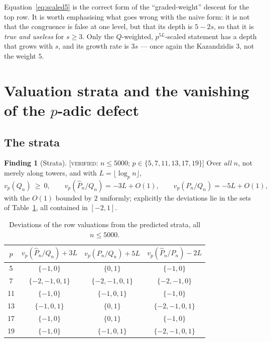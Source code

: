 \documentclass[11pt,reqno]{article}
\newcommand{\Ph}{\widehat{P}}
\newcommand{\vp}{v_p}
\newcommand{\floor}[1]{\lfloor #1 \rfloor}
\newcommand{\VER}[1]{{\normalfont\textsc{[verified:} #1\textsc{]}}}
\theoremstyle{plain}
\theoremstyle{definition}
\newtheorem{finding}[theorem]{Finding}
\theoremstyle{remark}
\numberwithin{equation}{section}
\begin{document}
Equation~\eqref{eq:scaled5} is the correct form of the ``graded-weight''
descent for the top row.  It is worth emphasising what goes wrong with the
naive form: it is not that the congruence is false at one level, but that its
depth is $5-2s$, so that it is \emph{true and useless} for $s\ge3$.  Only the
$Q$-weighted, $p^{5L}$-scaled statement has a depth that grows with $s$, and
its growth rate is $3s$ --- once again the Kazandzidis $3$, not the weight $5$.

\section{Valuation strata and the vanishing of the $p$-adic defect}\label{sec:strata}

\subsection{The strata}\label{ss:strata}

\begin{finding}[Strata]\label{find:strata}
\VER{$n\le5000$; $p\in\{5,7,11,13,17,19\}$}
Over \emph{all} $n$, not merely along towers, and with $L=\floor{\log_pn}$,
\[
  \vp(Q_n)\ \ge\ 0,\qquad
  \vp(\Ph_n/Q_n)=-3L+O(1),\qquad
  \vp(P_n/Q_n)=-5L+O(1),
\]
with the $O(1)$ bounded by $2$ uniformly; explicitly the deviations lie in the
sets of Table~\ref{tab:strata}, all contained in $[-2,1]$.
\end{finding}

\begin{table}[h]
\centering\small
\caption{Deviations of the row valuations from the predicted strata, all $n\le5000$.}
\label{tab:strata}
\begin{tabular}{@{}cccc@{}}
\toprule
$p$ & $\vp(\Ph_n/Q_n)+3L$ & $\vp(P_n/Q_n)+5L$ & $\vp(\Ph_n/P_n)-2L$\\
\midrule
5 & $\{-1,0\}$ & $\{0,1\}$ & $\{-1,0\}$\\
7 & $\{-2,-1,0,1\}$ & $\{-2,-1,0,1\}$ & $\{-2,-1,0\}$\\
11 & $\{-1,0\}$ & $\{-1,0,1\}$ & $\{-1,0\}$\\
13 & $\{-1,0,1\}$ & $\{0,1\}$ & $\{-2,-1,0,1\}$\\
17 & $\{-1,0\}$ & $\{0,1\}$ & $\{-1,0\}$\\
19 & $\{-1,0\}$ & $\{-1,0,1\}$ & $\{-2,-1,0,1\}$\\
\bottomrule
\end{tabular}
\end{table}
\end{document}
